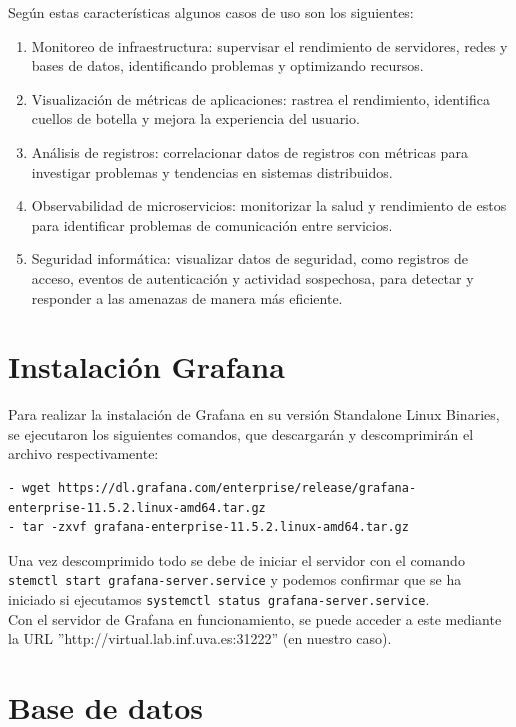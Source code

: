 \documentclass{article}
\begin{document}
Según estas características algunos casos de uso son los siguientes:

\begin{enumerate}
    \item Monitoreo de infraestructura: supervisar el rendimiento de servidores, redes y bases de datos, identificando problemas y optimizando recursos.
    \item Visualización de métricas de aplicaciones: rastrea el rendimiento, identifica cuellos de botella y mejora la experiencia del usuario.
    \item Análisis de registros: correlacionar datos de registros con métricas para investigar problemas y tendencias en sistemas distribuidos.
    \item Observabilidad de microservicios: monitorizar la salud y rendimiento de estos para identificar problemas de comunicación entre servicios.
    \item Seguridad informática: visualizar datos de seguridad, como registros de acceso, eventos de autenticación y actividad sospechosa, para detectar y responder a las amenazas de manera más eficiente.
\end{enumerate}

\section{Instalación Grafana}

Para realizar la instalación de Grafana en su versión Standalone Linux Binaries, se ejecutaron los siguientes comandos, que descargarán y descomprimirán el archivo respectivamente:

\begin{verbatim}
- wget https://dl.grafana.com/enterprise/release/grafana-
enterprise-11.5.2.linux-amd64.tar.gz
- tar -zxvf grafana-enterprise-11.5.2.linux-amd64.tar.gz
\end{verbatim}

Una vez descomprimido todo se debe de iniciar el servidor con el comando \lstinline[language=bash]|stemctl start grafana-server.service| 
y podemos confirmar que se ha iniciado si ejecutamos \lstinline[language=bash]|systemctl status grafana-server.service|.\\

Con el servidor de Grafana en funcionamiento, se puede acceder a este mediante la URL  ''http://virtual.lab.inf.uva.es:31222'' (en nuestro caso).

\section{Base de datos}
\end{document}
